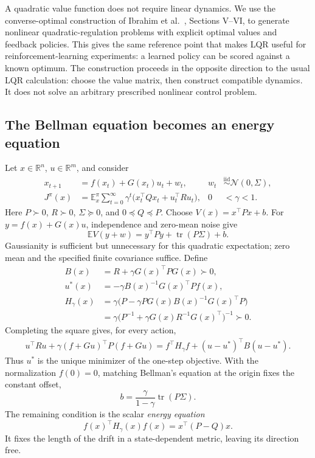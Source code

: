 \documentclass[11pt]{article}
\begin{document}
A quadratic value function does not require linear dynamics. We use the converse-optimal
construction of Ibrahim et al.~\cite{ibrahim2026}, Sections V--VI, to generate nonlinear
quadratic-regulation problems with explicit optimal values and feedback policies. This gives the
same reference point that makes LQR useful for reinforcement-learning experiments: a learned
policy can be scored against a known optimum. The construction proceeds in the opposite
direction to the usual LQR calculation: choose the value matrix, then construct compatible
dynamics. It does not solve an arbitrary prescribed nonlinear control problem.

\subsection{The Bellman equation becomes an energy equation}

Let $x\in\mathbb R^n$, $u\in\mathbb R^m$, and consider
\begin{align}
 x_{t+1}&=f(x_t)+G(x_t)u_t+w_t, & w_t&\stackrel{\mathrm{iid}}\sim\mathcal N(0,\Sigma),\\
 J^\pi(x)&=\mathbb E_x^\pi\sum_{t=0}^{\infty}\gamma^t
       \bigl(x_t^\top Qx_t+u_t^\top Ru_t\bigr), & 0&<\gamma<1.
\end{align}
Here $P\succ0$, $R\succ0$, $\Sigma\succeq0$, and $0\preceq Q\preceq P$.
Choose $V(x)=x^\top Px+b$. For $y=f(x)+G(x)u$, independence and zero-mean noise give
\[
 \mathbb E V(y+w)=y^\top Py+\operatorname{tr}(P\Sigma)+b.
\]
Gaussianity is sufficient but unnecessary for this quadratic expectation; zero mean and the
specified finite covariance suffice. Define
\begin{align}
 B(x)&=R+\gamma G(x)^\top PG(x)\succ0,\\
 u^*(x)&=-\gamma B(x)^{-1}G(x)^\top Pf(x),\label{eq:energy-policy}\\
 H_\gamma(x)&=\gamma\bigl(P-\gamma PG(x)B(x)^{-1}G(x)^\top P\bigr)\nonumber\\
 &=\gamma\bigl(P^{-1}+\gamma G(x)R^{-1}G(x)^\top\bigr)^{-1}\succ0.
\end{align}
Completing the square gives, for every action,
\begin{align}
 u^\top Ru+\gamma(f+Gu)^\top P(f+Gu)
 =f^\top H_\gamma f+(u-u^*)^\top B(u-u^*).
\end{align}
Thus $u^*$ is the unique minimizer of the one-step objective. With the normalization
$f(0)=0$, matching Bellman's equation at the origin fixes the constant offset,
\[
 b=\frac{\gamma}{1-\gamma}\operatorname{tr}(P\Sigma).
\]
The remaining condition is the scalar \emph{energy equation}
\begin{equation}
 \boxed{\quad f(x)^\top H_\gamma(x)f(x)=x^\top(P-Q)x.\quad}
 \label{eq:energy}
\end{equation}
It fixes the length of the drift in a state-dependent metric, leaving its direction free.
\end{document}
